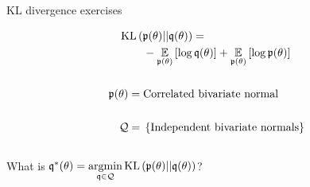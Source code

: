 \begin{frame}{KL divergence exercises}
\begin{minipage}{0.5\textwidth}
\begin{align*}
%
\MoveEqLeft
\kl{\p(\theta)}{\q(\theta)} ={}\\&
-\expect{\p(\theta)}{\log \q(\theta)} +
\expect{\p(\theta)}{\log \p(\theta)}\\ \\
\p(\theta) ={}& \textrm{Correlated bivariate normal}\\ \\
%
\qdom ={}& \left\{ \textrm{Independent bivariate normals}\right\}\\ \\
%
\end{align*}
%
What is
$\mathfrak{q}^*(\theta) ={} \underset{\mathfrak{q} \in \mathcal{Q}}{\mathrm{argmin}}\, \mathrm{KL}\left(\mathfrak{p}(\theta) || \mathfrak{q}(\theta) \right)$?
%
\end{minipage}
%
\begin{minipage}{0.4\textwidth}

\end{minipage}


\end{frame}





